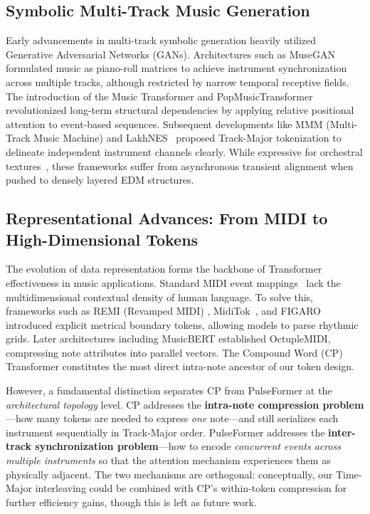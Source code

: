 \documentclass[conference]{IEEEtran}
\begin{document}
\subsection{Symbolic Multi-Track Music Generation}
Early advancements in multi-track symbolic generation heavily utilized Generative Adversarial Networks (GANs). Architectures such as MuseGAN \cite{dong2018musegan} formulated music as piano-roll matrices to achieve instrument synchronization across multiple tracks, although restricted by narrow temporal receptive fields. The introduction of the Music Transformer \cite{huang2019music} and PopMusicTransformer~\cite{huang2020pop} revolutionized long-term structural dependencies by applying relative positional attention to event-based sequences. Subsequent developments like MMM (Multi-Track Music Machine) \cite{ens2020mmm} and LakhNES~\cite{donahue2019lakhnes} proposed Track-Major tokenization to delineate independent instrument channels clearly. While expressive for orchestral textures~\cite{payne2019musenet, liu2022symphony}, these frameworks suffer from asynchronous transient alignment when pushed to densely layered EDM structures.

\subsection{Representational Advances: From MIDI to High-Dimensional Tokens}
The evolution of data representation forms the backbone of Transformer effectiveness in music applications. Standard MIDI event mappings~\cite{raffel2014pretty, raffel2016lakh, manilow2019cutting} lack the multidimensional contextual density of human language. To solve this, frameworks such as REMI (Revamped MIDI) \cite{huang2020remi}, MidiTok~\cite{fradet2021miditok}, and FIGARO~\cite{von2022figaro} introduced explicit metrical boundary tokens, allowing models to parse rhythmic grids. Later architectures including MusicBERT \cite{zeng2021musicbert} established OctupleMIDI, compressing note attributes into parallel vectors. The Compound Word (CP) Transformer \cite{hsiao2021compound} constitutes the most direct intra-note ancestor of our token design.

However, a fundamental distinction separates CP from PulseFormer at the \textit{architectural topology} level. CP addresses the \textbf{intra-note compression problem}—how many tokens are needed to express \textit{one} note—and still serializes each instrument sequentially in Track-Major order. PulseFormer addresses the \textbf{inter-track synchronization problem}—how to encode \textit{concurrent events across multiple instruments} so that the attention mechanism experiences them as physically adjacent. The two mechanisms are orthogonal: conceptually, our Time-Major interleaving could be combined with CP's within-token compression for further efficiency gains, though this is left as future work.
\end{document}
